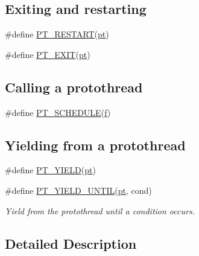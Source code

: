 \subsection*{Exiting and restarting}
\begin{DoxyCompactItemize}
\item 
\#define \hyperlink{group__pt_gacd3ac045f0a4ae63412e3b3d8780e8ab}{P\+T\+\_\+\+R\+E\+S\+T\+A\+R\+T}(\hyperlink{structpt}{pt})
\item 
\#define \hyperlink{group__pt_ga905451249dca72ce0385bf2a9ff178ee}{P\+T\+\_\+\+E\+X\+I\+T}(\hyperlink{structpt}{pt})
\end{DoxyCompactItemize}
\subsection*{Calling a protothread}
\begin{DoxyCompactItemize}
\item 
\#define \hyperlink{group__pt_gafa82b860a64b67d25ab3abc21811896f}{P\+T\+\_\+\+S\+C\+H\+E\+D\+U\+L\+E}(\hyperlink{io_2ledstrip_8c_a80a3b5dce6f851991c2338361e16f313}{f})
\end{DoxyCompactItemize}
\subsection*{Yielding from a protothread}
\begin{DoxyCompactItemize}
\item 
\#define \hyperlink{group__pt_ga155cba6121323726d02c00284428fed6}{P\+T\+\_\+\+Y\+I\+E\+L\+D}(\hyperlink{structpt}{pt})
\item 
\#define \hyperlink{group__pt_gae3c821e3a388615528efda9d23c7d115}{P\+T\+\_\+\+Y\+I\+E\+L\+D\+\_\+\+U\+N\+T\+I\+L}(\hyperlink{structpt}{pt}, cond)
\begin{DoxyCompactList}\small\item\em Yield from the protothread until a condition occurs. \end{DoxyCompactList}\end{DoxyCompactItemize}


\subsection{Detailed Description}



